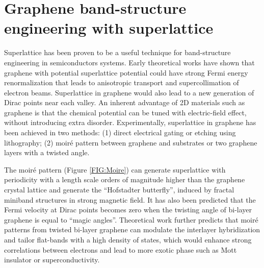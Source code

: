 \documentclass[pdflatex, sectionletters, 12pt]{pittetd}    %
\begin{document}
\section{Graphene band-structure engineering with superlattice}

Superlattice has been proven to be a useful technique for band-structure engineering in semiconductors systems\cite{tsu2010superlattice}. Early theoretical works have shown that graphene with potential superlattice potential could have strong Fermi energy renormalization that leads to anisotropic transport\cite{park2008anisotropic} and supercollimation of electron beams\cite{park2008electron}. Superlattice in graphene would also lead to a new generation of Dirac points near each valley\cite{park2008new}. An inherent advantage of 2D materials such as graphene is that the chemical potential can be tuned with electric-field effect, without introducing extra disorder\cite{cao2018correlated}. Experimentally, superlattice in graphene has been achieved in two methods: (1) direct electrical gating or etching using lithography\cite{dubey2013tunable, forsythe2018band, jessen2019lithographic}; (2) moir{\'e} pattern between graphene and substrates\cite{dean2013hofstadter, hunt2013massive, ponomarenko2013cloing} or two graphene layers with a twisted angle\cite{cao2016superlattice, cao2018correlated, cao2018unconventional, chen2018gate, yankowitz2018dynamic}. 

The moir{\'e} pattern (Figure \ref{FIG:Moire}) can generate superlattice with periodicity with a length scale orders of magnitude higher than the graphene crystal lattice and generate the ``Hofstadter butterfly'', induced by fractal miniband structures in strong magnetic field\cite{dean2013hofstadter, hunt2013massive, ponomarenko2013cloing}. It has also been predicted\cite{bistritzer2011moire} that the Fermi velocity at Dirac points becomes zero when the twisting angle of bi-layer graphene is equal to ``magic angles''. Theoretical work\cite{bistritzer2011moire, suarez2010flat, lopes2012continuum} further predicts that moir{\'e} patterns from twisted bi-layer graphene can modulate the interlayer hybridization and tailor flat-bands with a high density of states, which would enhance strong correlations between electrons and lead to more exotic phase such as Mott insulator\cite{cao2016superlattice, cao2018correlated, chen2018gate} or superconductivity\cite{cao2018unconventional}.
\end{document}
